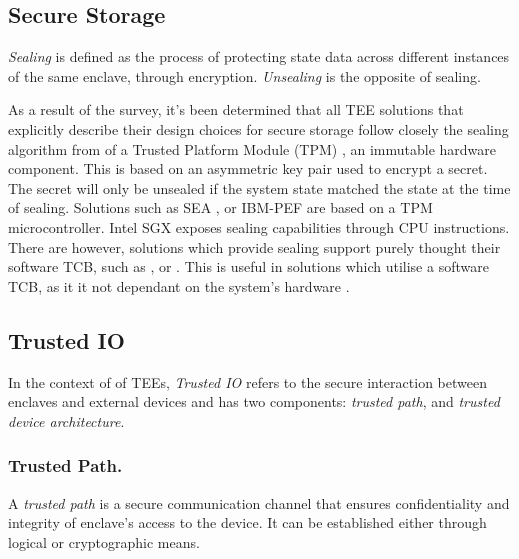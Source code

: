 \documentclass[runningheads,a4paper]{uwsese}
\begin{document}

\subsection{Secure Storage}

\emph{Sealing} is defined as the process of protecting state data across different 
instances of the same enclave, through encryption. \emph{Unsealing} is the opposite 
of sealing.

As a result of the survey, it's been determined that all TEE solutions that
explicitly describe their design choices for secure storage follow closely the
sealing algorithm from of a Trusted Platform Module (TPM) \cite{trust_plat_mod}
, an immutable hardware component. This is based on an
asymmetric key pair used to encrypt a secret. The secret will only be unsealed
if the system state matched the state at the time of sealing. Solutions such as
SEA \cite{sea_minimal_tcb}, or IBM-PEF \cite{ibm_pef} are based on a TPM
microcontroller. Intel SGX \cite{intel_sgx} exposes sealing capabilities
through CPU instructions. There are however, solutions which provide sealing
support purely thought their software TCB, such as \cite{optee}, or
\cite{tee_timber}. This is useful in solutions which utilise a software TCB, as
it it not dependant on the system's hardware \cite{tee_hw_sup}.

\subsection{Trusted IO}

In the context of of TEEs, \emph{Trusted IO} refers to the secure interaction
between enclaves and external devices and has two components: \emph{trusted path},
and \emph{trusted device architecture}.

\subsubsection{Trusted Path.}

A \emph{trusted path} is a secure communication channel that ensures
confidentiality and integrity of enclave's access to the device. It can be
established either through logical or cryptographic means.
\end{document}
